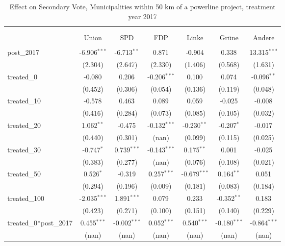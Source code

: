 \begin{table}[!htbp] \centering
  \caption{Effect on Secondary Vote, Municipalities within 50 km of a powerline project, treatment year 2017}
\begin{tabular}{@{\extracolsep{5pt}}lcccccc}
\\[-1.8ex]\hline
\hline \\[-1.8ex]
\\[-1.8ex] & \multicolumn{1}{c}{Union} & \multicolumn{1}{c}{SPD} & \multicolumn{1}{c}{FDP} & \multicolumn{1}{c}{Linke} & \multicolumn{1}{c}{Grüne} & \multicolumn{1}{c}{Andere}  \\
\hline \\[-1.8ex]
 post_2017 & -6.906$^{***}$ & -6.713$^{**}$ & 0.871$^{}$ & -0.904$^{}$ & 0.338$^{}$ & 13.315$^{***}$ \\
  & (2.304) & (2.647) & (2.330) & (1.406) & (0.568) & (1.631) \\
 treated_0 & -0.080$^{}$ & 0.206$^{}$ & -0.206$^{***}$ & 0.100$^{}$ & 0.074$^{}$ & -0.096$^{**}$ \\
  & (0.452) & (0.306) & (0.054) & (0.136) & (0.119) & (0.048) \\
 treated_10 & -0.578$^{}$ & 0.463$^{}$ & 0.089$^{}$ & 0.059$^{}$ & -0.025$^{}$ & -0.008$^{}$ \\
  & (0.416) & (0.284) & (0.073) & (0.085) & (0.105) & (0.032) \\
 treated_20 & 1.062$^{**}$ & -0.475$^{}$ & -0.132$^{***}$ & -0.230$^{**}$ & -0.207$^{*}$ & -0.017$^{}$ \\
  & (0.440) & (0.301) & (nan) & (0.099) & (0.115) & (0.025) \\
 treated_30 & -0.747$^{*}$ & 0.739$^{***}$ & -0.143$^{***}$ & 0.175$^{**}$ & 0.001$^{}$ & -0.025$^{}$ \\
  & (0.383) & (0.277) & (nan) & (0.076) & (0.108) & (0.021) \\
 treated_50 & 0.526$^{*}$ & -0.319$^{}$ & 0.257$^{***}$ & -0.679$^{***}$ & 0.164$^{**}$ & 0.051$^{}$ \\
  & (0.294) & (0.196) & (0.009) & (0.181) & (0.083) & (0.184) \\
 treated_100 & -2.035$^{***}$ & 1.891$^{***}$ & 0.079$^{}$ & 0.233$^{}$ & -0.352$^{**}$ & 0.183$^{}$ \\
  & (0.423) & (0.271) & (0.100) & (0.151) & (0.140) & (0.229) \\
 treated_0*post_2017 & 0.455$^{***}$ & -0.002$^{***}$ & 0.052$^{***}$ & 0.540$^{***}$ & -0.180$^{***}$ & -0.864$^{***}$ \\
  & (nan) & (nan) & (nan) & (nan) & (nan) & (nan) \\

\end{tabular}
\end{table}
